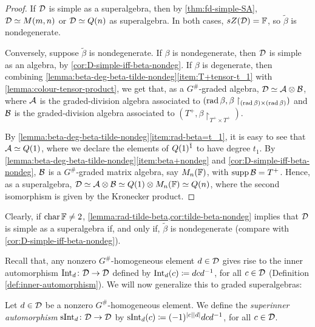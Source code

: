 \begin{proof}
    If $\mathcal{D}$ is simple as a superalgebra, then by \cref{thm:fd-simple-SA}, $\mathcal{D} \simeq M(m,n)$ or $\mathcal{D} \simeq Q(n)$ as superalgebra. 
    In both cases, $sZ(\mathcal{D}) = \mathbb{F}$, so $\tilde\beta$ is nondegenerate.

    Conversely, suppose $\tilde\beta$ is nondegenerate. 
    If $\beta$ is nondegenerate, then $\mathcal{D}$ is simple as an algebra, by \cref{cor:D-simple-iff-beta-nondeg}.  
    If $\beta$ is degenerate, then combining  \cref{lemma:beta-deg-beta-tilde-nondeg}\eqref{item:T+tensor-t_1} with \cref{lemma:colour-tensor-product}, we get that, as a $G^\#$-graded algebra, $\mathcal{D} \simeq \mathcal A \otimes \mathcal B$, where $\mathcal A$ is the graded-division algebra associated to $(\operatorname{rad} \beta, \beta\restriction_{(\operatorname{rad} \beta)\times (\operatorname{rad} \beta)})$ and $\mathcal B$ is the graded-division algebra associated to $(T^+, \beta\restriction_{T^+ \times T^+})$. 
    
    By \cref{lemma:beta-deg-beta-tilde-nondeg}\eqref{item:rad-beta=t_1}, it is easy to see that $\mathcal A \simeq Q(1)$, where we declare the elements of $Q(1)^{\bar1}$ to have degree $t_1$. 
    By \cref{lemma:beta-deg-beta-tilde-nondeg}\eqref{item:beta+nondeg} and \cref{cor:D-simple-iff-beta-nondeg}, $\mathcal B$ is a $G^\#$-graded matrix algebra, say $M_n(\mathbb{F})$, with $\operatorname{supp} \mathcal B = T^+$. 
    Hence, as a superalgebra, $\mathcal{D} \simeq \mathcal A \otimes \mathcal B \simeq Q(1) \otimes M_n(\mathbb{F}) \simeq Q(n)$, where the second isomorphism is given by the Kronecker product. 
\end{proof}

\begin{remark}\label{rmk:D-simple-iff-tilde-beta-nondeg}
    Clearly, if $\operatorname{char} \mathbb{F} \neq 2$, \cref{lemma:rad-tilde-beta,cor:tilde-beta-nondeg} implies that $\mathcal{D}$ is simple as a superalgebra if, and only if, $\tilde\beta $ is nondegenerate (compare with \cref{cor:D-simple-iff-beta-nondeg}). 
\end{remark}

Recall that, any nonzero $G^\#$-homogeneous element $d\in \mathcal{D}$ gives rise to the inner automorphism $\operatorname{Int}_d\colon \mathcal{D} \to \mathcal{D}$ defined by $\operatorname{Int}_d (c) \coloneqq dcd^{-1}$, for all $c\in \mathcal{D}$ (Definition \ref{def:inner-automorphism}). 
We will now generalize this to graded superalgebras:

\begin{defi}\label{def:superinner}
	Let $d\in \mathcal{D}$ be a nonzero $G^\#$-homogeneous element.
	We define the \emph{superinner automorphism} $\operatorname{sInt}_d\colon \mathcal{D} \to \mathcal{D}$ by $\operatorname{sInt}_d (c) \coloneqq (-1)^{|c||d|} dcd^{-1}$, for all $c\in \mathcal{D}$.
\end{defi}

